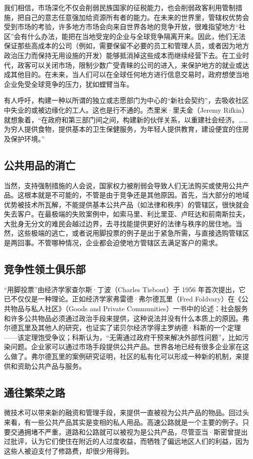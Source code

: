 我们相信，市场深化不仅会削弱民族国家的征税能力，也会削弱政客利用管制措施，把自己的意志任意强加给资源所有者的能力。在未来的世界里，管辖权优势会受到市场的考验，许多地方市场会向来自世界各地的竞争开放，很难指望地方“社区”会有什么办法，能把在当地受宠的企业与全球竞争隔离开来。因此，他们无法保证那些高成本的公司（例如，需要保留不必要的员工和管理人员，或者因为地方政治压力而保持无用设施的开发）能够抵消掉这些成本而继续经营下去。在工业时代，政客可以关闭市场，限制少数广受青睐的公司的进入，来保护地方的就业或达成其他目的。在未来，当人们可以在全球任何地方进行信息交易时，政府想使当地企业免受全球竞争的压力，犹如螳臂当车。

有人呼吁，构建一种以所谓的独立或志愿部门为中心的“新社会契约”，去吸收社区中失业的或被边缘化的工人。这也是行不通的。杰里米·里夫金（Jeremy Rifkin）就想象着，“在政府和第三部门间之间，构建新的伙伴关系，以重建社会经济。……为穷人提供食物，提供基本的卫生保健服务，为年轻人提供教育，建设便宜的住房及保护环境。”

\subsection{公共用品的消亡}
当然，支持强制措施的人会说，国家权力被削弱会导致人们无法购买或使用公共产品。这根本就是不可能的，不管是由于竞争还是其他原因。首先，当大部分的地域优势被技术所瓦解，不能提供基本公共产品（如法律和秩序）的管辖区，很快就会失去客户。在最极端的失败案例中，如索马里、利比里亚、卢旺达和前南斯拉夫，大批身无分文的难民会越过边界，去寻找能提供更好的法律与秩序的居住地。当然，这些极端的逃亡，或者说用脚投票的例子是出于紧急所需，与直接选购管辖区是两回事。不管哪种情况，企业都会迫使地方管辖区去满足客户的需求。

\subsection{竞争性领土俱乐部}
“用脚投票”由经济学家查尔斯·丁波（Charles Tiebout）于 1956 年首次提出，它已不仅仅是一种理论。正如经济学家弗雷德·弗尔德瓦里（Fred Foldvary）在《公共物品与私人社区》（Goods and Private Communities）一书中的论述：社会服务和许多公共物品必须通过政治手段来提供，这种说法并没有什么本质上的原因。弗尔德瓦里及其他人的研究，也证实了诺贝尔经济学得主罗纳德·科斯的一个定理——该定理饱受争议；科斯认为，“无需通过政府干预来解决外部性问题”，比如污染问题。企业家可以通过市场手段提供公共产品。世界各地已经有很多企业家在这么做了。弗尔德瓦里的案例研究证明，社区的私有化可以形成一种新的机制，来提供和资助公共产品与服务。

\subsection{通往繁荣之路}
微技术可以带来新的融资和管理手段，来提供一直被视为公共产品的物品。回过头来看，有一些公共产品其实是变相的私人用品。高速公路就是一个主要的例子。只要交通拥堵不严重，道路和公路就可以被视为是公共产品，尽管亚当·斯密曾提出过批评，认为它们使住在附近的人过度收益，而牺牲了偏远地区人们的利益，因为这些人被迫支付了修路费，却很少用得到。

